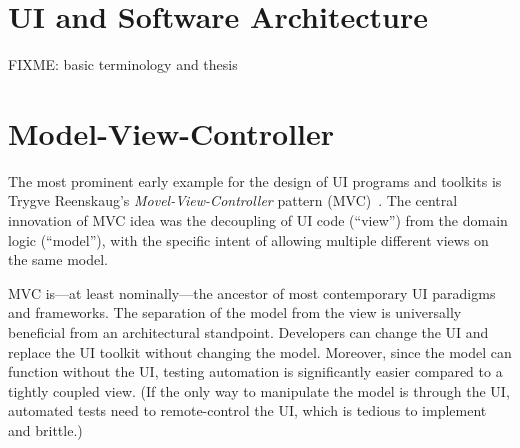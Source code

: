 \documentclass[sigplan,screen]{acmart}
\begin{document}



\maketitle

\section{UI and Software Architecture}

FIXME: basic terminology and thesis

\section{Model-View-Controller}


The most prominent early example for the design of UI programs and
toolkits is Trygve Reenskaug's \textit{Movel-View-Controller} pattern
(MVC)~\cite{MVC}.  The central innovation of MVC idea was the
decoupling of UI code (``view'') from the domain logic (``model''),
with the specific intent of allowing multiple different views on the
same model.

MVC is---at least nominally---the ancestor of most contemporary UI
paradigms and frameworks.  The separation of the model from the view
is universally beneficial from an architectural standpoint.
Developers can change the UI and replace the UI toolkit without
changing the model.  Moreover, since the model can function without
the UI, testing automation is significantly easier compared to a
tightly coupled view.  (If the only way to manipulate the model is
through the UI, automated tests need to remote-control the UI, which
is tedious to implement and brittle.)
\end{document}
